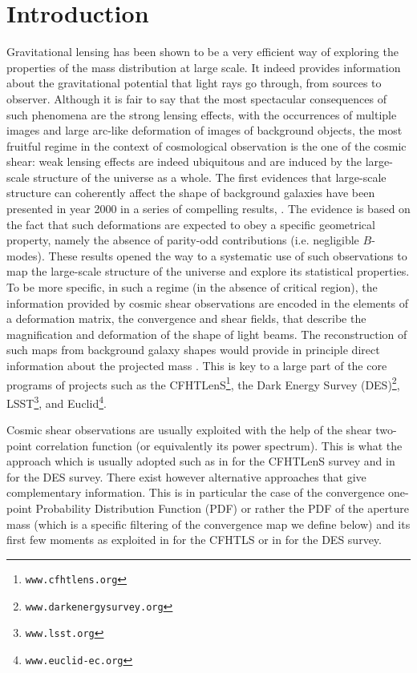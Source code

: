 \documentclass[twocolumn,aps,reprint, nofootinbib]{revtex4}
\begin{document}
\section{Introduction}

Gravitational lensing has been shown to be a very efficient way of exploring the properties of the mass distribution at large scale. It indeed
provides information about the gravitational potential that light rays go through, from sources to observer. Although it is fair to say that the most spectacular consequences of such phenomena are the strong lensing effects, with the occurrences of multiple images and large arc-like deformation of images of background objects, the most fruitful regime  in the context of cosmological observation is the one of the cosmic shear: weak lensing effects are indeed ubiquitous and are induced by the large-scale structure of the universe as a whole. 
The first evidences that large-scale structure can coherently affect the shape of background galaxies have been presented in year 2000 in a series of compelling results, \cite{2000Natur.405..143W,2000A&A...358...30V,2000MNRAS.318..625B}. The evidence is based on the fact that such deformations are expected to obey a specific geometrical property, namely the absence of parity-odd contributions (i.e. negligible $B$-modes).
These results opened the way to a systematic use of such observations to map the large-scale structure of the universe and explore its statistical properties. To be more specific, in such a regime (in the absence of critical region), the information provided by cosmic shear observations are encoded in the elements of a deformation matrix, the convergence and shear fields, that describe the magnification and deformation of the shape of light beams. The reconstruction of such maps from background galaxy shapes would provide in principle direct information about the projected mass \cite{2003astro.ph..5089V,  munshi2008cosmology, kilbinger2015cosmology}.  This is key to a large part of the core programs of projects such as the CFHTLenS\footnote{\texttt{www.cfhtlens.org}}, the Dark Energy Survey (DES)\footnote{\texttt{www.darkenergysurvey.org}}, LSST\footnote{\texttt{www.lsst.org}}, and Euclid\footnote{\texttt{www.euclid-ec.org}}.

Cosmic shear observations are usually exploited with the help of the shear two-point correlation function (or equivalently its power spectrum). This is what the approach which is usually adopted such as in 
\cite{2008A&A...479....9F} for the CFHTLenS survey
and in 
\cite{2016PhRvD..94b2002B} for the DES survey. There exist however alternative approaches that give complementary information. This is in particular the case of the convergence one-point Probability Distribution Function (PDF) or rather the PDF of the aperture mass (which is a specific filtering of the convergence map we define below) and its first few moments as exploited in 
\cite{2014MNRAS.441.2725F}
for the CFHTLS or in
\cite{2016MNRAS.463.3653K}
for the DES survey.
\end{document}

